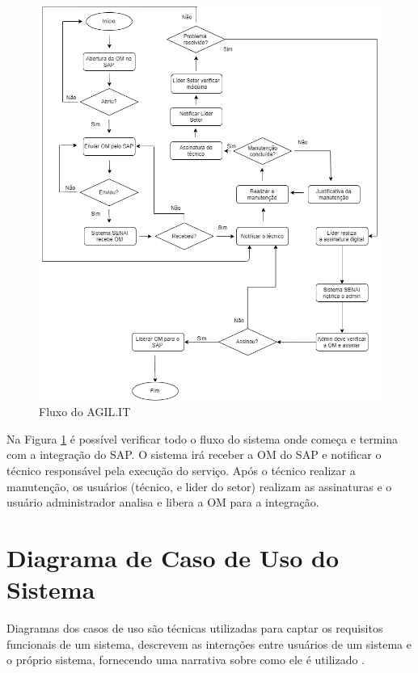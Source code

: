 {{\newpage
\begin{figure}[htb]
	\caption{\label{flux_sys}Fluxo do AGIL.IT}
	\begin{center}
		\includegraphics[scale=0.55]{./Figuras/fluxo-sistema.png}
	\end{center}
\end{figure}

Na Figura \ref{flux_sys} é possível verificar todo o fluxo do sistema onde começa e termina com a integração do SAP.
O sistema irá receber a OM do SAP e notificar o técnico responsável pela execução do serviço. Após o técnico realizar a manutenção, os usuários (técnico, e lider do setor) realizam as assinaturas e o usuário administrador analisa e libera a OM para a integração.


\section{Diagrama de Caso de Uso do Sistema }

{Diagramas dos casos de uso são técnicas utilizadas para captar os requisitos funcionais de um sistema, descrevem as interações entre usuários de um sistema e o próprio sistema, fornecendo uma narrativa sobre como ele é utilizado \cite{umlessencial2005}.
	
}}}
